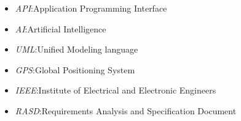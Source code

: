 \begin{itemize}
	
\item \textit{API}:\@ Application Programming Interface
\item \textit{AI}:\@ Artificial Intelligence
\item \textit{UML}:\@ Unified Modeling language
\item \textit{GPS}:\@ Global Positioning System
\item \textit{IEEE}:\@ Institute of Electrical and Electronic Engineers
\item \textit{RASD}:\@ Requirements Analysis and Specification Document

\end{itemize}